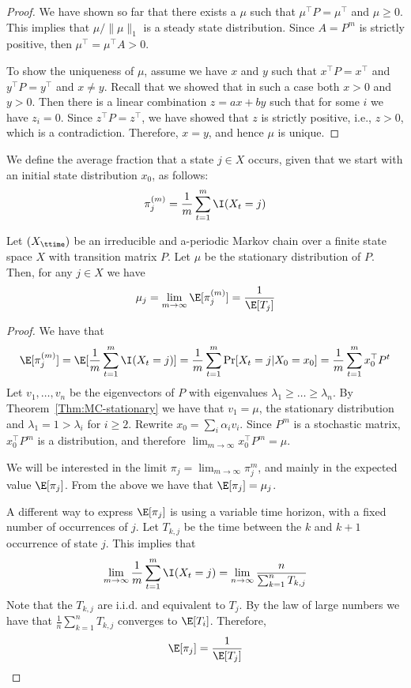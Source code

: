 \begin{proof}
We have shown so far that there exists a $\mu$ such that $\mu^\top
P=\mu^\top$ and $\mu\geq 0$. This implies that $\mu/\|\mu\|_1$ is a steady state distribution.
Since $A=P^m$ is strictly positive,
then $\mu^\top=\mu^\top A >0$.

To show the uniqueness of $\mu$, assume we have $x$ and $y$ such
that $x^\top P=x^\top$ and $y^\top P=y^\top$ and $x\neq y$. Recall
that we showed that in such a case both $x>0$ and $y>0$. Then there
is a linear combination $z=ax+by$ such that for some $i$ we have
$z_i=0$. Since $z^\top P=z^\top$, we have showed that $z$ is
strictly positive, i.e., $z>0$, which is a contradiction. Therefore,
$x=y$, and hence $\mu$ is unique.
\end{proof}

We define the average fraction that a state $j\in X$ occurs, given
that we start with an initial state distribution $x_0$,  as follows:
\[
\pi^{(m)}_j=\frac{1}{m}\sum_{t=1}^m \I (X_t=j)
\]

\begin{theorem}
Let $({X_\ttime})$ be an irreducible and  a-periodic Markov chain
over a finite state space $X$ with transition matrix $P$. Let $\mu$
be the stationary distribution of $P$. Then, for any $j\in X$ we
have
\[
\mu_j=\lim_{m\rightarrow\infty} \E[\pi^{(m)}_j] =\frac{1}{\E[T_j]}
\]
\end{theorem}

\begin{proof}
We have that
\[
\E[\pi^{(m)}_j]=\E[\frac{1}{m}\sum_{t=1}^m \I
(X_t=j)]=\frac{1}{m}\sum_{t=1}^m \Pr
[X_t=j|X_0=x_0]=\frac{1}{m}\sum_{t=1}^m x_0^\top P^t
\]
Let $v_1, \ldots , v_n$ be the eigenvectors of $P$ with eigenvalues
$\lambda_1 \geq  \ldots \geq  \lambda_n$. By
Theorem~\ref{Thm:MC-stationary} we have that $v_1=\mu$, the stationary
distribution and $\lambda_1=1>\lambda_i$ for $i\geq 2$. Rewrite
$x_0=\sum_i \alpha_i v_i$. Since $P^m$ is a stochastic matrix,
$x_0^\top P^m$ is a distribution, and therefore $\lim_{m\rightarrow
\infty} x_0^\top P^m=\mu$.

We will be interested in the limit $\pi_j=\lim_{m\rightarrow \infty}
\pi^{m}_j $, and mainly in the expected value $\E[\pi_j]$. From the
above we have that $\E[\pi_j]=\mu_j$.

A different way to express $\E[\pi_j]$ is using a variable time
horizon, with a fixed number of occurrences of $j$. Let $T_{k,j}$ be
the time between the $k$ and $k+1$ occurrence of state $j$. This
implies that
\[
\lim_{m\rightarrow\infty}\frac{1}{m}\sum_{t=1}^m \I (X_t=j) =
\lim_{n\rightarrow\infty} \frac{n}{\sum_{k=1}^n T_{k,j}}
\]
Note that the $T_{k,j}$ are i.i.d. and equivalent to $T_j$. By the
law of large numbers we have that $\frac{1}{n}\sum_{k=1}^n T_{k,j}$
converges to $\E[T_i]$. Therefore,
\[
\E[\pi_j]=\frac{1}{\E[T_j]}
\]
\end{proof}


